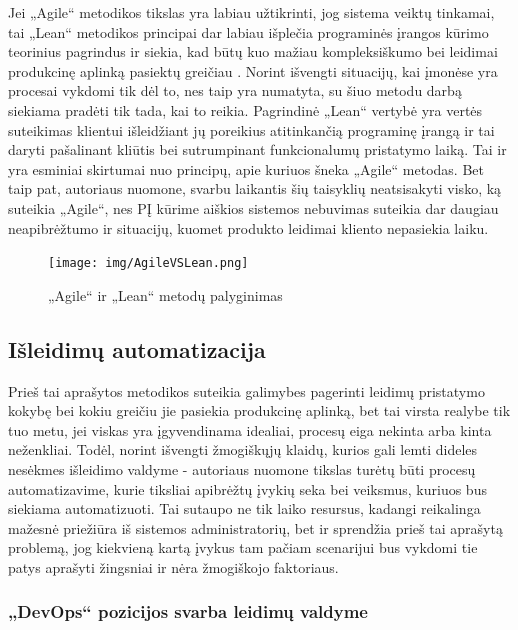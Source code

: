 \documentclass{VUMIFPSkursinis}
\begin{document}
Jei „Agile“ metodikos tikslas yra labiau užtikrinti, jog sistema veiktų tinkamai, tai „Lean“ metodikos principai dar labiau išplečia programinės įrangos kūrimo teorinius pagrindus ir siekia, kad būtų kuo mažiau kompleksiškumo bei leidimai produkcinę aplinką pasiektų greičiau \cite{SaltSestas}. Norint išvengti situacijų, kai įmonėse yra procesai vykdomi tik dėl to, nes taip yra numatyta, su šiuo metodu darbą siekiama pradėti tik tada, kai to reikia. Pagrindinė „Lean“ vertybė yra vertės suteikimas klientui išleidžiant jų poreikius atitinkančią programinę įrangą ir tai daryti pašalinant kliūtis bei sutrumpinant funkcionalumų pristatymo laiką. Tai ir yra esminiai skirtumai nuo principų, apie kuriuos šneka „Agile“ metodas. Bet taip pat, autoriaus nuomone, svarbu laikantis šių taisyklių neatsisakyti visko, ką suteikia „Agile“, nes PĮ kūrime aiškios sistemos nebuvimas suteikia dar daugiau neapibrėžtumo ir situacijų, kuomet produkto leidimai kliento nepasiekia laiku.

\begin{figure}[H]
    \centering
    \texttt{[image: img/AgileVSLean.png]}
    \caption{„Agile“ ir „Lean“ metodų palyginimas}
    \label{img:mlp}
\end{figure}

\subsection{Išleidimų automatizacija}

Prieš tai aprašytos metodikos suteikia galimybes pagerinti leidimų pristatymo kokybę bei kokiu greičiu jie pasiekia produkcinę aplinką, bet tai virsta realybe tik tuo metu, jei viskas yra įgyvendinama idealiai, procesų eiga nekinta arba kinta neženkliai. Todėl, norint išvengti žmogiškųjų klaidų, kurios gali lemti dideles nesėkmes išleidimo valdyme - autoriaus nuomone tikslas turėtų būti procesų automatizavime, kurie tiksliai apibrėžtų įvykių seka bei veiksmus, kuriuos bus siekiama automatizuoti. Tai sutaupo ne tik laiko resursus, kadangi reikalinga mažesnė priežiūra iš sistemos administratorių, bet ir sprendžia prieš tai aprašytą problemą, jog kiekvieną kartą įvykus tam pačiam scenarijui bus vykdomi tie patys aprašyti žingsniai ir nėra žmogiškojo faktoriaus.

    \subsubsection{„DevOps“ pozicijos svarba leidimų valdyme}
\end{document}
